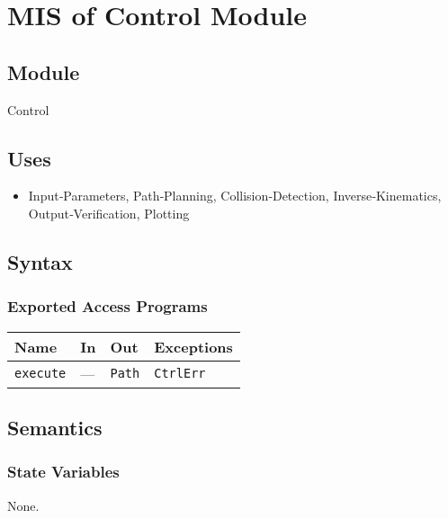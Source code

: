\documentclass[12pt, titlepage]{article}
\begin{document}
\newpage
\section{MIS of Control Module}
\label{mod:control}

\subsection{Module}
Control

\subsection{Uses}
\begin{itemize}
  \item Input‑Parameters, Path‑Planning, Collision‑Detection,
        Inverse‑Kinematics, Output‑Verification, Plotting
\end{itemize}

\subsection{Syntax}
\subsubsection{Exported Access Programs}
\begin{center}
\renewcommand{\arraystretch}{1.3}
\begin{tabular}{p{3.2cm} p{4cm} p{3cm} p{3cm}}
\toprule
\textbf{Name} & \textbf{In} & \textbf{Out} & \textbf{Exceptions}\\ \midrule
\texttt{execute} & --- & \texttt{Path} & \texttt{CtrlErr}\\
\bottomrule
\end{tabular}
\end{center}

\subsection{Semantics}
\subsubsection{State Variables}
None.
\end{document}
